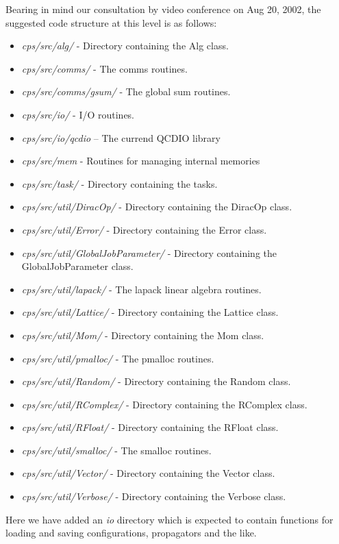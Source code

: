 \documentclass[12pt]{article}
\begin{document}
Bearing in mind our consultation by video conference on Aug 20, 2002,
the suggested code structure at this level is as follows:
\begin{itemize}
\setlength{\itemsep}{0.0cm}
 \item \emph{cps/src/alg/} - Directory containing the Alg class.
 \item \emph{cps/src/comms/} - The comms routines.
 \item \emph{cps/src/comms/gsum/} - The global sum routines.
 \item \emph{cps/src/io/} - I/O routines.
 \item \emph{cps/src/io/qcdio} -- The currend QCDIO library
 \item \emph{cps/src/mem} - Routines for managing internal memories
 \item \emph{cps/src/task/} - Directory containing the tasks.
 \item \emph{cps/src/util/DiracOp/} - Directory containing the DiracOp class.
 \item \emph{cps/src/util/Error/} - Directory containing the Error class.
 \item \emph{cps/src/util/GlobalJobParameter/} - Directory containing the GlobalJobParameter class.
 \item \emph{cps/src/util/lapack/} - The lapack linear algebra routines.
 \item \emph{cps/src/util/Lattice/} - Directory containing the Lattice class.
 \item \emph{cps/src/util/Mom/} - Directory containing the Mom class.
 \item \emph{cps/src/util/pmalloc/} - The pmalloc routines.
 \item \emph{cps/src/util/Random/} - Directory containing the Random class.
 \item \emph{cps/src/util/RComplex/} - Directory containing the RComplex class.
 \item \emph{cps/src/util/RFloat/} - Directory containing the RFloat class.
 \item \emph{cps/src/util/smalloc/} - The smalloc routines.
 \item \emph{cps/src/util/Vector/} - Directory containing the Vector class.
 \item \emph{cps/src/util/Verbose/} - Directory containing the Verbose class.
\end{itemize}

Here we have added an \emph{io} directory which is expected to contain
functions for loading and saving configurations, propagators and the like.
\end{document}
